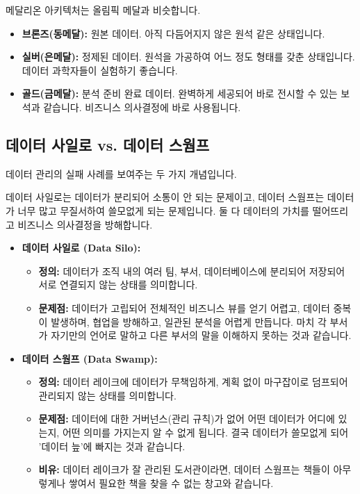 \documentclass[11pt,a4paper]{article}
\theoremstyle{definition}
\begin{document}
\begin{examplebox}[title=올림픽 메달 비유]
메달리온 아키텍처는 올림픽 메달과 비슷합니다.
\begin{itemize}
    \item \textbf{브론즈(동메달):} 원본 데이터. 아직 다듬어지지 않은 원석 같은 상태입니다.
    \item \textbf{실버(은메달):} 정제된 데이터. 원석을 가공하여 어느 정도 형태를 갖춘 상태입니다. 데이터 과학자들이 실험하기 좋습니다.
    \item \textbf{골드(금메달):} 분석 준비 완료 데이터. 완벽하게 세공되어 바로 전시할 수 있는 보석과 같습니다. 비즈니스 의사결정에 바로 사용됩니다.
\end{itemize}
\end{examplebox}

\subsection{데이터 사일로 vs. 데이터 스웜프}
데이터 관리의 실패 사례를 보여주는 두 가지 개념입니다.

\begin{summarybox}[title=핵심 요약: 데이터 관리의 함정]
데이터 사일로는 데이터가 분리되어 소통이 안 되는 문제이고, 데이터 스웜프는 데이터가 너무 많고 무질서하여 쓸모없게 되는 문제입니다. 둘 다 데이터의 가치를 떨어뜨리고 비즈니스 의사결정을 방해합니다.
\end{summarybox}

\begin{itemize}
    \item \textbf{데이터 사일로 (Data Silo):}
    \begin{itemize}
        \item \textbf{정의:} 데이터가 조직 내의 여러 팀, 부서, 데이터베이스에 분리되어 저장되어 서로 연결되지 않는 상태를 의미합니다.
        \item \textbf{문제점:} 데이터가 고립되어 전체적인 비즈니스 뷰를 얻기 어렵고, 데이터 중복이 발생하며, 협업을 방해하고, 일관된 분석을 어렵게 만듭니다. 마치 각 부서가 자기만의 언어로 말하고 다른 부서의 말을 이해하지 못하는 것과 같습니다.
    \end{itemize}
    \item \textbf{데이터 스웜프 (Data Swamp):}
    \begin{itemize}
        \item \textbf{정의:} 데이터 레이크에 데이터가 무책임하게, 계획 없이 마구잡이로 덤프되어 관리되지 않는 상태를 의미합니다.
        \item \textbf{문제점:} 데이터에 대한 거버넌스(관리 규칙)가 없어 어떤 데이터가 어디에 있는지, 어떤 의미를 가지는지 알 수 없게 됩니다. 결국 데이터가 쓸모없게 되어 '데이터 늪'에 빠지는 것과 같습니다.
    \item \textbf{비유:} 데이터 레이크가 잘 관리된 도서관이라면, 데이터 스웜프는 책들이 아무렇게나 쌓여서 필요한 책을 찾을 수 없는 창고와 같습니다.
    \end{itemize}
\end{itemize}
\end{document}
